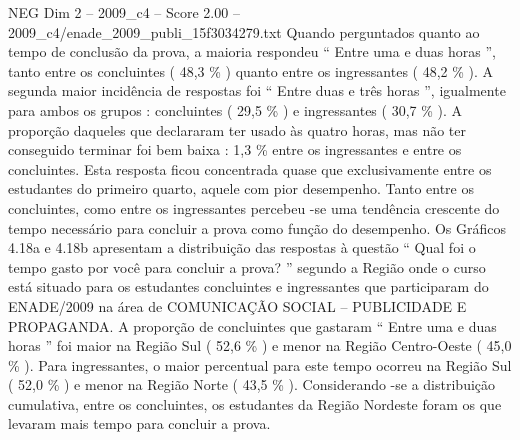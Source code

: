 \begin{textsample}{NEG Dim 2 – 2009\_c4 – Score 2.00 – 2009\_c4/enade\_2009\_publi\_15f3034279.txt}
Quando perguntados quanto ao tempo de conclusão da prova, a maioria respondeu “ Entre uma e duas horas ”, tanto entre os concluintes ( 48,3 \% ) quanto entre os ingressantes ( 48,2 \% ).
A segunda maior incidência de respostas foi “ Entre duas e três horas ”, igualmente para ambos os grupos : concluintes ( 29,5 \% ) e ingressantes ( 30,7 \% ).
A proporção daqueles que declararam ter usado às quatro horas, mas não ter conseguido terminar foi bem baixa : 1,3 \% entre os ingressantes e entre os concluintes.
Esta resposta ficou concentrada quase que exclusivamente entre os estudantes do primeiro quarto, aquele com pior desempenho.
Tanto entre os concluintes, como entre os ingressantes percebeu -se uma tendência crescente do tempo necessário para concluir a prova como função do desempenho.
Os Gráficos 4.18a e 4.18b apresentam a distribuição das respostas à questão “ Qual foi o tempo gasto por você para concluir a prova? ” segundo a Região onde o curso está situado para os estudantes concluintes e ingressantes que participaram do ENADE/2009 na área de COMUNICAÇÃO SOCIAL – PUBLICIDADE E PROPAGANDA.
A proporção de concluintes que gastaram “ Entre uma e duas horas ” foi maior na Região Sul ( 52,6 \% ) e menor na Região Centro-Oeste ( 45,0 \% ).
Para ingressantes, o maior percentual para este tempo ocorreu na Região Sul ( 52,0 \% ) e menor na Região Norte ( 43,5 \% ).
Considerando -se a distribuição cumulativa, entre os concluintes, os estudantes da Região Nordeste foram os que levaram mais tempo para concluir a prova.

\end{textsample}
